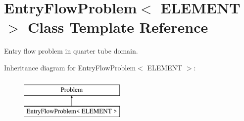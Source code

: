 \hypertarget{classEntryFlowProblem}{}\section{Entry\+Flow\+Problem$<$ E\+L\+E\+M\+E\+NT $>$ Class Template Reference}
\label{classEntryFlowProblem}


Entry flow problem in quarter tube domain.  


Inheritance diagram for Entry\+Flow\+Problem$<$ E\+L\+E\+M\+E\+NT $>$\+:\begin{figure}[H]
\begin{center}
\leavevmode
\includegraphics[height=2.000000cm]{classEntryFlowProblem}
\end{center}
\end{figure}
